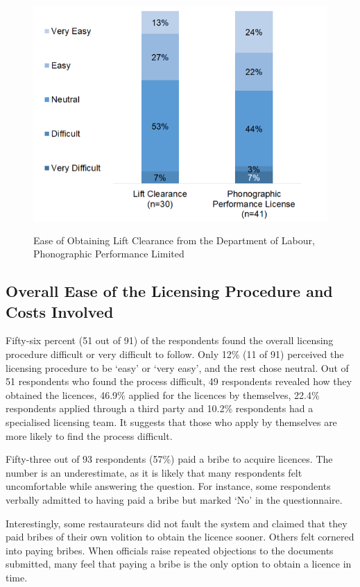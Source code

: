 \documentclass[a4paper, 12pt]{article}
\begin{document}
		\begin{figure}[H]
                    	\centering
                    	\includegraphics[height = 3.5in]{Figure5.png}
                    	\caption[Optional Caption]{Ease of Obtaining Lift Clearance from the Department of Labour, Phonographic Performance Limited}
		\end{figure}	
		
		\subsection{Overall Ease of the Licensing Procedure and Costs Involved}
		Fifty-six percent (51 out of 91) of the respondents found the overall licensing procedure difficult or very difficult to follow. Only 12\% (11 of 91) perceived the licensing procedure to be ‘easy’ or ‘very easy’, and the rest chose neutral. Out of 51 respondents 
who found the process difficult, 49 respondents revealed how they obtained the licences, 46.9\% applied for the licences by themselves, 22.4\% respondents applied through a third party and 10.2\% respondents had a specialised licensing team. It suggests that 
those who apply by themselves are more likely to find the process difficult.
		
		Fifty-three out of 93 respondents (57\%) paid a bribe to acquire licences. The number is an underestimate, as it is likely that many respondents felt uncomfortable while answering the question. For instance, some respondents verbally admitted to having 
paid a bribe but marked ‘No’ in the questionnaire.
		
		Interestingly, some restaurateurs did not fault the system and claimed that they paid bribes of their own volition to obtain the licence sooner. Others felt cornered into paying bribes. When officials raise repeated objections to the documents submitted, 
many feel that paying a bribe is the only option to obtain a licence in time.
		
\end{document}
